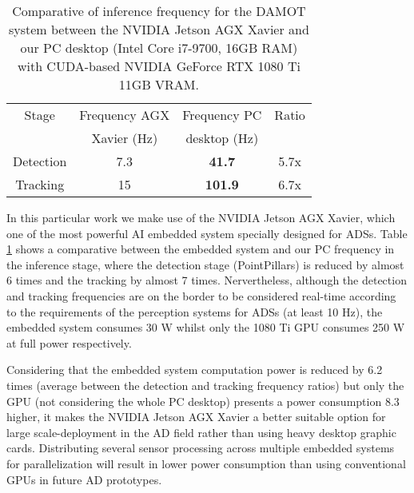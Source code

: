 \begin{table}[h]
	\captionsetup{justification=justified}
	\caption[Comparative of inference frequency for the \ac{DAMOT} system between the NVIDIA Jetson AGX Xavier and our PC desktop]{Comparative of inference frequency for the \ac{DAMOT} system between the NVIDIA Jetson AGX Xavier and our PC desktop (Intel Core i7-9700, 16GB RAM) with CUDA-based NVIDIA GeForce RTX 1080 Ti 11GB VRAM.}
	\label{table:4_smartmot_xavier_vs_computer_hz}
	\begin{center}
		\begin{tabular}{ c | c c c}
			\toprule
			Stage & Frequency AGX &  Frequency PC & Ratio \\
			& Xavier (Hz) & desktop (Hz) & \\
			\midrule
			Detection & 7.3 & \bf{41.7} & 5.7x \\
			\hline
			Tracking & 15 & \bf{101.9} & 6.7x \\
			\bottomrule
		\end{tabular}
	\end{center}
\end{table}

In this particular work we make use of the NVIDIA Jetson AGX Xavier, which one of the most powerful \ac{AI} embedded system specially designed for \acp{ADS}. Table \ref{table:4_smartmot_xavier_vs_computer_hz} shows a comparative between the embedded system and our PC frequency in the inference stage, where the detection stage (PointPillars) is reduced by almost 6 times and the tracking by almost 7 times. Nervertheless, although the detection and tracking frequencies are on the border to be considered real-time according to the requirements of the perception systems for \acp{ADS} (at least 10 Hz), the embedded system consumes 30 W whilst only the 1080 Ti GPU consumes 250 W at full power respectively. 

Considering that the embedded system computation power is reduced by 6.2 times (average between the detection and tracking frequency ratios) but only the \ac{GPU} (not considering the whole PC desktop) presents a power consumption 8.3 higher, it makes the NVIDIA Jetson AGX Xavier a better suitable option for large scale-deployment in the \ac{AD} field rather than using heavy desktop graphic cards. Distributing several sensor processing across multiple embedded systems for parallelization will result in lower power consumption than using conventional \acp{GPU} in future \ac{AD} prototypes. 

